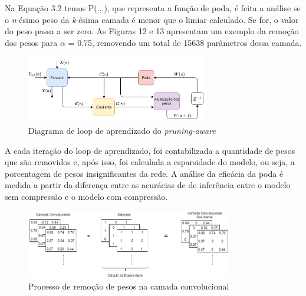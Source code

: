 Na Equação 3.2 temos P(.,.), que representa a função de poda, é feita a análise se o \textit{n}-ésimo peso da \textit{k}-ésima camada é menor que o limiar calculado. Se for, o valor do peso passa a ser zero. As Figuras 12 e 13 apresentam um exemplo da remoção dos pesos para $ \alpha $ = 0.75, removendo um total de 15638 parâmetros dessa camada.

\begin{figure}[!h]
	\includegraphics[width=0.7\textwidth, keepaspectratio=true]{figuras/diagram.png}
	\centering
	\caption[Diagrama de loop de aprendizado do \textit{pruning-aware}]{Diagrama de loop de aprendizado do \textit{pruning-aware}}
\end{figure}

A cada iteração do loop de aprendizado, foi contabilizada a quantidade de pesos que são removidos e, após isso, foi calculada a esparsidade do modelo, ou seja, a porcentagem de pesos insignificantes da rede. A análise da eficácia da poda é medida a partir da diferença entre as acurácias de de inferência entre o modelo sem compressão e o modelo com compressão.

\begin{figure}[H]
	\includegraphics[width=0.8\textwidth, keepaspectratio=true]{figuras/tfmul.png}
	\centering
	\caption[Processo de remoção de pesos na camada convolucional]{Processo de remoção de pesos na camada convolucional}
\end{figure}

